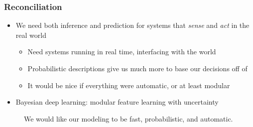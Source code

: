 \documentclass[10pt,mathserif]{beamer}
\begin{document}
\begin{frame}
  \frametitle{Reconciliation}
  \begin{itemize}
  \item We need both inference and prediction for systems that \textit{sense}
    and \textit{act} in the real world
    \begin{itemize}
    \item Need systems running in real time, interfacing with the world
    \item Probabilistic descriptions give us much more to base our decisions off of
    \item It would be nice if everything were automatic, or at least modular
    \end{itemize}
  \item Bayesian deep learning: modular feature learning with uncertainty
  \end{itemize}
  \begin{figure}
  \caption{We would like our modeling to be fast, probabilistic, and automatic.}
  \end{figure}
\end{frame}
\end{document}
